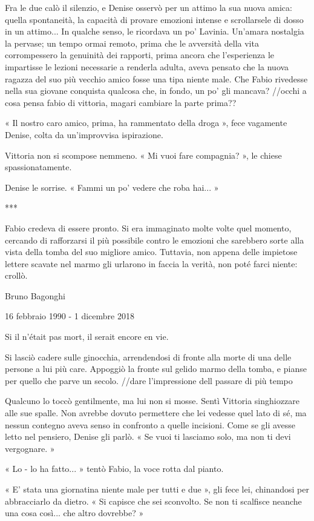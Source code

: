 Fra le due calò il silenzio, e Denise osservò per un attimo la sua nuova amica: quella spontaneità, la capacità di provare emozioni intense e scrollarsele di dosso in un attimo... In qualche senso, le ricordava un po' Lavinia. Un'amara nostalgia la pervase; un tempo ormai remoto, prima che le avversità della vita corrompessero la genuinità dei rapporti, prima ancora che l'esperienza le impartisse le lezioni necessarie a renderla adulta, aveva pensato che la nuova ragazza del suo più vecchio amico fosse una tipa niente male. Che Fabio rivedesse nella sua giovane conquista qualcosa che, in fondo, un po' gli mancava?
//occhi a cosa pensa fabio di vittoria, magari cambiare la parte prima??

« Il nostro caro amico, prima, ha rammentato della droga », fece vagamente Denise, colta da un'improvvisa ispirazione.

Vittoria non si scompose nemmeno. « Mi vuoi fare compagnia? », le chiese spassionatamente.

Denise le sorrise. « Fammi un po' vedere che roba hai... »

***

Fabio credeva di essere pronto. Si era immaginato molte volte quel momento, cercando di rafforzarsi il più possibile contro le emozioni che sarebbero sorte alla vista della tomba del suo migliore amico. Tuttavia, non appena delle impietose lettere scavate nel marmo gli urlarono in faccia la verità, non poté farci niente: crollò.

Bruno Bagonghi

16 febbraio 1990 - 1 dicembre 2018

Si il n'était pas mort, il serait encore en vie.

Si lasciò cadere sulle ginocchia, arrendendosi di fronte alla morte di una delle persone a lui più care. Appoggiò la fronte sul gelido marmo della tomba, e pianse per quello che parve un secolo. //dare l'impressione dell passare di più tempo

Qualcuno lo toccò gentilmente, ma lui non si mosse. Sentì Vittoria singhiozzare alle sue spalle. Non avrebbe dovuto permettere che lei vedesse quel lato di sé, ma nessun contegno aveva senso in confronto a quelle incisioni. Come se gli avesse letto nel pensiero, Denise gli parlò. « Se vuoi ti lasciamo solo, ma non ti devi vergognare. »

« Lo - lo ha fatto... » tentò Fabio, la voce rotta dal pianto.

« E' stata una giornatina niente male per tutti e due », gli fece lei, chinandosi per abbracciarlo da dietro. « Si capisce che sei sconvolto. Se non ti scalfisce neanche una cosa così... che altro dovrebbe? »

